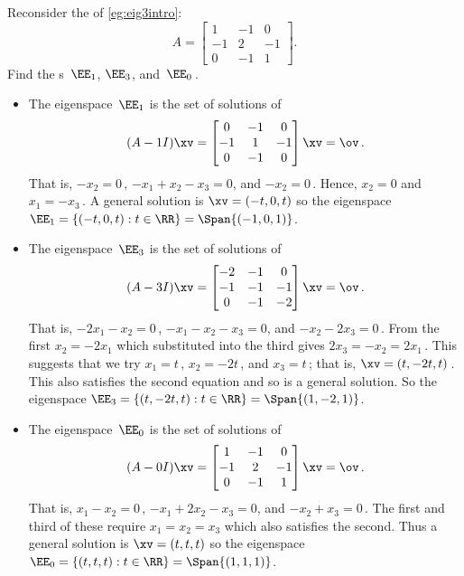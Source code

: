 \begin{example} \label{eg:eig3sp}
Reconsider the  of \cref{eg:eig3intro}:
\begin{equation*}
A=\begin{bmatrix} 1&-1&0\\-1&2&-1\\0&-1&1 \end{bmatrix}.
\end{equation*} 
Find the s~\(\EE_1\), \(\EE_3\), and~\(\EE_0\)\,.
\begin{solution} 
\begin{itemize}
\item The eigenspace~\(\EE_1\) is the set of solutions of
\begin{equation*}
(A-1I)\xv=\begin{bmatrix} 0&-1&0\\-1&1&-1\\0&-1&0 \end{bmatrix}
\xv=\ov\,.
\end{equation*}
That is, \(-x_2=0\)\,, \(-x_1+x_2-x_3=0\), and \(-x_2=0\)\,.
Hence, \(x_2=0\) and \(x_1=-x_3\)\,.
A general solution is \(\xv=(-t,0,t)\) so the eigenspace \(\EE_1=\{(-t,0,t) : t\in\RR\}=\Span\{(-1,0,1)\}\).

\item The eigenspace~\(\EE_3\) is the set of solutions of
\begin{equation*}
(A-3I)\xv=\begin{bmatrix} -2&-1&0\\-1&-1&-1\\0&-1&-2 \end{bmatrix}
\xv=\ov\,.
\end{equation*}
That is, \(-2x_1-x_2=0\)\,, \(-x_1-x_2-x_3=0\), and \(-x_2-2x_3=0\)\,.
From the first \(x_2=-2x_1\) which substituted into the third gives \(2x_3=-x_2=2x_1\)\,.  
This suggests that we try \(x_1=t\)\,, \(x_2=-2t\)\,, and \(x_3=t\)\,; that is, \(\xv=(t,-2t,t)\)\,.
This also satisfies the second equation and so is a general solution.
So the eigenspace \(\EE_3=\{(t,-2t,t) : t\in\RR\}=\Span\{(1,-2,1)\}\).

\item The eigenspace~\(\EE_0\) is the set of solutions of
\begin{equation*}
(A-0I)\xv=\begin{bmatrix} 1&-1&0\\-1&2&-1\\0&-1&1 \end{bmatrix}
\xv=\ov\,.
\end{equation*}
That is, \(x_1-x_2=0\)\,, \(-x_1+2x_2-x_3=0\), and \(-x_2+x_3=0\)\,.
The first and third of these require \(x_1=x_2=x_3\) which also satisfies the second.
Thus a general solution is \(\xv=(t,t,t)\) so the eigenspace \(\EE_0=\{(t,t,t) : t\in\RR\}=\Span\{(1,1,1)\}\). 
\end{itemize}
\end{solution}
\end{example}





